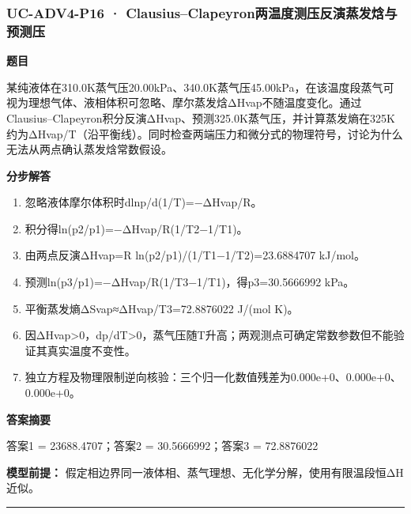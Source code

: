 \documentclass[UTF8,11pt,a4paper]{ctexart}
\begin{document}
\subsubsection*{UC-ADV4-P16 · Clausius–Clapeyron两温度测压反演蒸发焓与预测压}
\noindent\textbf{题目}\par
某纯液体在310.0K蒸气压20.00kPa、340.0K蒸气压45.00kPa，在该温度段蒸气可视为理想气体、液相体积可忽略、摩尔蒸发焓ΔHvap不随温度变化。通过Clausius–Clapeyron积分反演ΔHvap、预测325.0K蒸气压，并计算蒸发熵在325K约为ΔHvap/T（沿平衡线）。同时检查两端压力和微分式的物理符号，讨论为什么无法从两点确认蒸发焓常数假设。\par
\medskip\noindent\textbf{分步解答}
\begin{enumerate}
\item 忽略液体摩尔体积时dlnp/d(1/T)=−ΔHvap/R。
\item 积分得ln(p2/p1)=−ΔHvap/R(1/T2−1/T1)。
\item 由两点反演ΔHvap=R ln(p2/p1)/(1/T1−1/T2)=23.6884707 kJ/mol。
\item 预测ln(p3/p1)=−ΔHvap/R(1/T3−1/T1)，得p3=30.5666992 kPa。
\item 平衡蒸发熵ΔSvap≈ΔHvap/T3=72.8876022 J/(mol K)。
\item 因ΔHvap>0，dp/dT>0，蒸气压随T升高；两观测点可确定常数参数但不能验证其真实温度不变性。
\item 独立方程及物理限制逆向核验：三个归一化数值残差为0.000e+0、0.000e+0、0.000e+0。
\end{enumerate}
\noindent\textbf{答案摘要}\par
答案1 = 23688.4707；答案2 = 30.5666992；答案3 = 72.8876022\par
\noindent\textbf{模型前提：}
假定相边界同一液体相、蒸气理想、无化学分解，使用有限温段恒ΔH近似。\par
\medskip\hrule\medskip
{}
\end{document}
